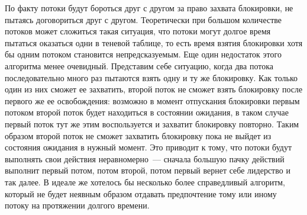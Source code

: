 По факту потоки будут бороться друг с другом за право захвата блокировки, не пытаясь договориться друг с другом. Теоретически при большом количестве потоков может сложиться такая ситуация, что потоки могут долгое время пытаться оказаться одни в теневой таблице, то есть время взятия блокировки хотя бы одним потоком становится непредсказуемым. Еще один недостаток этого алгоритма менее очевидный. Представим себе ситуацию, когда два потока последовательно много раз пытаются взять одну и ту же блокировку. Как только один из них сможет ее захватить, второй поток не сможет взять блокировку после первого же ее освобождения: возможно в момент отпускания блокировки первым потоком второй поток будет находиться в состоянии ожидания, в таком случае первый поток тут же этим воспользуется и захватит блокировку повторно. Таким образом второй поток не сможет захватить блокировку пока не выйдет из состояния ожидания в нужный момент. Это приводит к тому, что потоки будут выполнять свои действия неравномерно~--- сначала большую пачку действий выполнит первый потом, потом второй, потом первый вернет себе лидерство и так далее. В идеале же хотелось бы несколько более справедливый алгоритм, который не будет неявным образом отдавать предпочтение тому или иному потоку на протяжении долгого времени.